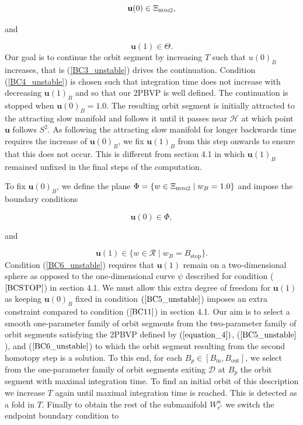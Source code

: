 \documentclass{ws-ijbc}
\begin{document}
\begin{equation}
\mathbf{u}(0) \in \Xi_{\textsc{hom2}},
\label{BC3_unstable}
\end{equation}

\noindent
and 

\begin{equation}
\mathbf{u}(1) \in \Theta.
\label{BC4_unstable}
\end{equation}
\noindent
Our goal is to continue the orbit segment by increasing $T$ such that $u(0)_B$ increases, that is (\ref{BC3_unstable}) drives the continuation.  Condition (\ref{BC4_unstable}) is chosen such that integration time does not increase with decreasing $\mathbf{u}(1)_B$ and so that our 2PBVP is well defined.  The continuation is stopped when $\mathbf{u}(0)_B =1.0$.  The resulting orbit segment is initially attracted to the attracting slow manifold and follows it until it passes near $\mathscr{H}$ at which point $\mathbf{u}$ follows $S^2$.  As following the attracting slow manifold for longer backwards time requires the increase of $\mathbf{u}(0)_B$, we fix $\mathbf{u}(1)_B$ from this step onwards to ensure that this does not occur.  This is different from section 4.1 in which $\mathbf{u}(1)_B$ remained unfixed in the final steps of the computation. 

To fix $\mathbf{u}(0)_B$, we define the plane $\Phi = \{w \in \Xi_{\textsc{hom2}} \; | \;  w_B=1.0\}$ and impose the boundary conditions

\begin{equation}
\mathbf{u}(0) \in \Phi,
\label{BC5_unstable}
\end{equation}

\noindent
and 

\begin{equation}
\mathbf{u}(1) \in \{ w \in \mathscr{R} \; | \; w_B=B_{\mathrm{stop}}\}.
\label{BC6_unstable}
\end{equation}
\noindent
Condition (\ref{BC6_unstable}) requires that $\mathbf{u}(1)$ remain on a two-dimensional sphere as opposed to the one-dimensional curve $\psi$ described for condition ($\ref{BCSTOP}$) in section 4.1.  We must allow this extra degree of freedom for $\mathbf{u}(1)$ as keeping $\mathbf{u}(0)_B$ fixed in condition $(\ref{BC5_unstable}$) imposes an extra constraint compared to condition ($\ref{BC11}$) in section 4.1.  Our aim is to select a smooth one-parameter family of orbit segments from the two-parameter family of orbit segments satisfying the 2PBVP defined by $(\ref{equation_4})$, ($\ref{BC5_unstable}$), and ($\ref{BC6_unstable}$) to which the orbit segment resulting from the second homotopy step is a solution.  To this end, for each $B_p \in [B_{\mathrm{in}},B_{\mathrm{out}}]$, we select from the one-parameter family of orbit segments exiting $\mathscr{D}$ at $B_p$ the orbit segment with maximal integration time.  To find an initial orbit of this description we increase $T$ again until maximal integration time is reached.  This is detected as a fold in $T$.  Finally to obtain the rest of the submanifold $W^u_{r^*}$ we switch the endpoint boundary condition to
\end{document}
